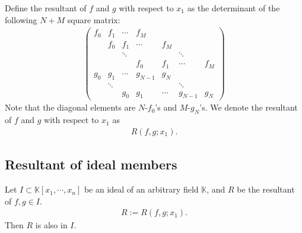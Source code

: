 \documentclass[11pt]{book}
\begin{document}
Define the resultant of $f$ and $g$ with respect to $x_1$ as the determinant of the following $N+M$ square matrix:
\begin{eqnarray}
\left(\begin{array}{ccccccc} f_0 & f_1 & \cdots  & f_M &   &   &   \\ & f_0 & f_1 & \cdots  & f_M &   &   \\  &   & \ddots  &   &   & \ddots  &   \\  &   &   &  f_0 & f_1 & \cdots  & f_M  \\ g_0  & g_1   & \cdots  & g_{N-1}  &g_N&   &   \\  &  \ddots &   &   &   &  \ddots &   \\  &   &  g_0 &  g_1 & \cdots  & g_{N-1}  & g_N \end{array}\right)
\end{eqnarray}
Note that the diagonal elements are $N$-$f_0$'s and $M$-$g_N$'s.
We denote the resultant of $f$ and $g$ with respect to $x_1$ as
\begin{eqnarray}
R(f,g; x_1).
\end{eqnarray}


\subsection{Resultant of ideal members}
\label{ResultantOfIdeal}
Let $I \subset \mathbb{K}[x_1, \cdots, x_n]$ be an ideal of an arbitrary field $\mathbb{K}$, and $R$ be the resultant of $f,g \in I$.
\begin{eqnarray}
R := R(f,g; x_1).
\end{eqnarray}
Then $R$ is also in $I$.
\end{document}

